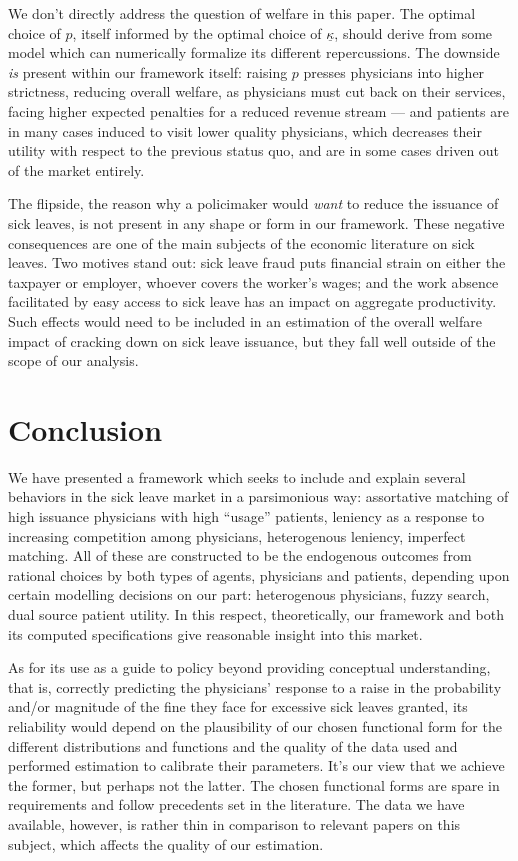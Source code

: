 \documentclass[../main.tex]{subfiles}
\begin{document}
We don't directly address the question of welfare in this paper. The optimal choice of $p$, itself informed by the optimal choice of $\underline{\kappa}$, should derive from some model which can numerically formalize its different repercussions. The downside \textit{is} present within our framework itself: raising $p$ presses physicians into higher strictness, reducing overall welfare, as physicians must cut back on their services, facing higher expected penalties for a reduced revenue stream — and patients are in many cases induced to visit lower quality physicians, which decreases their utility with respect to the previous status quo, and are in some cases driven out of the market entirely.

The flipside, the reason why a policimaker would \textit{want} to reduce the issuance of sick leaves, is not present in any shape or form in our framework. These negative consequences are one of the main subjects of the economic literature on sick leaves. Two motives stand out: sick leave fraud puts financial strain on either the taxpayer or employer, whoever covers the worker's wages; and the work absence facilitated by easy access to sick leave has an impact on aggregate productivity. Such effects would need to be included in an estimation of the overall welfare impact of cracking down on sick leave issuance, but they fall well outside of the scope of our analysis.

\section{Conclusion}

We have presented a framework which seeks to include and explain several behaviors in the sick leave market in a parsimonious way: assortative matching of high issuance physicians with high ``usage'' patients, leniency as a response to increasing competition among physicians, heterogenous leniency, imperfect matching. All of these are constructed to be the endogenous outcomes from rational choices by both types of agents, physicians and patients, depending upon certain modelling decisions on our part: heterogenous physicians, fuzzy search, dual source patient utility. In this respect, theoretically, our framework and both its computed specifications give reasonable insight into this market.

As for its use as a guide to policy beyond providing conceptual understanding, that is, correctly predicting the physicians' response to a raise in the probability and/or magnitude of the fine they face for excessive sick leaves granted, its reliability would depend on the plausibility of our chosen functional form for the different distributions and functions and the quality of the data used and performed estimation to calibrate their parameters. It's our view that we achieve the former, but perhaps not the latter. The chosen functional forms are spare in requirements and follow precedents set in the literature. The data we have available, however, is rather thin in comparison to relevant papers on this subject, which affects the quality of our estimation.
\end{document}
